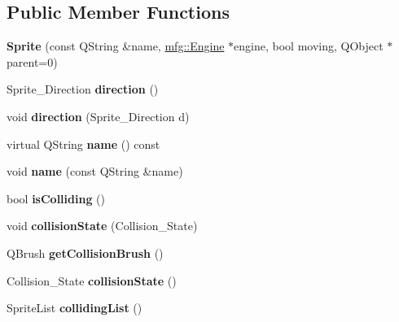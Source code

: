 \subsection*{Public Member Functions}
\begin{DoxyCompactItemize}
\item 
\mbox{\label{class_sprite_a0f5230614f211b04056a376b83ecd9e5}} 
{\bfseries Sprite} (const Q\+String \&name, \hyperlink{classmfg_1_1_engine}{mfg\+::\+Engine} $\ast$engine, bool moving, Q\+Object $\ast$parent=0)
\item 
\mbox{\label{class_sprite_a8cc9c3ebeab9f25834f1f8c171880e0e}} 
Sprite\+\_\+\+Direction {\bfseries direction} ()
\item 
\mbox{\label{class_sprite_a69ced4a3db80daf660bdbc2e9aced096}} 
void {\bfseries direction} (Sprite\+\_\+\+Direction d)
\item 
\mbox{\label{class_sprite_a9b0acb015439554398b064411d3e0ab9}} 
virtual Q\+String {\bfseries name} () const
\item 
\mbox{\label{class_sprite_af14553ba4a7bb1234f336f42e5162915}} 
void {\bfseries name} (const Q\+String \&name)
\item 
\mbox{\label{class_sprite_a67ca36798b90d7365e52555dbc0d2c2e}} 
bool {\bfseries is\+Colliding} ()
\item 
\mbox{\label{class_sprite_a1b0178ef50baf6b4c14f94d3c68ab595}} 
void {\bfseries collision\+State} (Collision\+\_\+\+State)
\item 
\mbox{\label{class_sprite_a1a702eca5ba1fc379918dffdfb90e7c2}} 
Q\+Brush {\bfseries get\+Collision\+Brush} ()
\item 
\mbox{\label{class_sprite_a49e10268cfc2bec206820d224c892e2c}} 
Collision\+\_\+\+State {\bfseries collision\+State} ()
\item 
\mbox{\label{class_sprite_a683492949abb6ef283debc24a97b3535}} 
Sprite\+List {\bfseries colliding\+List} ()
\item 
\mbox{\label{class_sprite_a67a8273fc7db9ed534cca3957d1a0598}} 

\end{DoxyCompactItemize}
